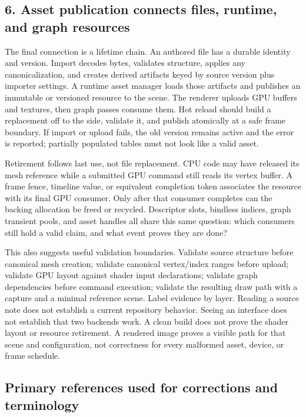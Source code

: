 \subsection{6. Asset publication connects files, runtime, and graph resources}\label{06-engine-ii-ch042-asset-publication-connects-files-runtime-and-graph-resources}

\hypertarget{06-engine-ii-ch042-asset-publication-connects-files-runtime-and-graph-resources}{}

The final connection is a lifetime chain. An authored file has a durable identity and version. Import decodes bytes, validates structure, applies any canonicalization, and creates derived artifacts keyed by source version plus importer settings. A runtime asset manager loads those artifacts and publishes an immutable or versioned resource to the scene. The renderer uploads GPU buffers and textures, then graph passes consume them. Hot reload should build a replacement off to the side, validate it, and publish atomically at a safe frame boundary. If import or upload fails, the old version remains active and the error is reported; partially populated tables must not look like a valid asset.

Retirement follows last use, not file replacement. CPU code may have released its mesh reference while a submitted GPU command still reads its vertex buffer. A frame fence, timeline value, or equivalent completion token associates the resource with its final GPU consumer. Only after that consumer completes can the backing allocation be freed or recycled. Descriptor slots, bindless indices, graph transient pools, and asset handles all share this same question: which consumers still hold a valid claim, and what event proves they are done?

This also suggests useful validation boundaries. Validate source structure before canonical mesh creation; validate canonical vertex/index ranges before upload; validate GPU layout against shader input declarations; validate graph dependencies before command execution; validate the resulting draw path with a capture and a minimal reference scene. Label evidence by layer. Reading a source note does not establish a current repository behavior. Seeing an interface does not establish that two backends work. A clean build does not prove the shader layout or resource retirement. A rendered image proves a visible path for that scene and configuration, not correctness for every malformed asset, device, or frame schedule.

\subsection{Primary references used for corrections and terminology}\label{06-engine-ii-ch042-primary-references-used-for-corrections-and-terminology}

